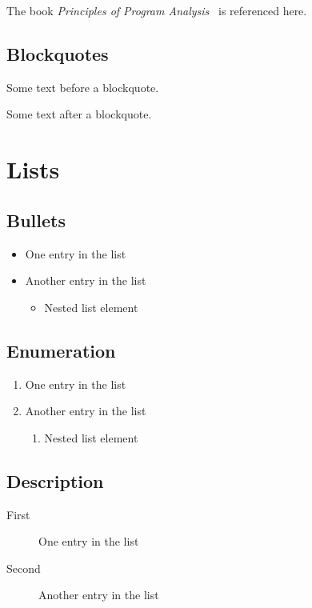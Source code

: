 \documentclass[parskip=half]{scrbook}
\begin{document}
The book \emph{Principles of Program Analysis}~\cite{Nielson:ppa} is referenced here.

\subsection{Blockquotes}

Some text before a blockquote.

\begin{quote}
	\lipsum[3]
\end{quote}

Some text after a blockquote.

\section{Lists}

\subsection{Bullets}

\begin{itemize}
	\item One entry in the list
	\item Another entry in the list
	      \begin{itemize}
		      \item Nested list element
	      \end{itemize}
\end{itemize}

\subsection{Enumeration}

\begin{enumerate}
	\item One entry in the list
	\item Another entry in the list
	      \begin{enumerate}
		      \item Nested list element
	      \end{enumerate}
\end{enumerate}

\subsection{Description}

\begin{description}
	\item[First] One entry in the list
	\item[Second] Another entry in the list
\end{description}
\end{document}
